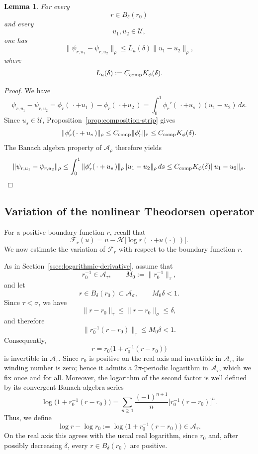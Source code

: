 \documentclass[11pt,a4paper]{amsart}
\newtheorem{lemma}[theorem]{Lemma}
\begin{document}
\begin{lemma}\label{lem:psi-u-stability}
	For every
	\[
	r\in B_\delta(r_0)
	\]
	and every
	\[
	u_1,u_2\in\mathcal U,
	\]
	one has
	\begin{equation}\label{eq:psi-u-stability}
		\|\psi_{r,u_1}-\psi_{r,u_2}\|_\rho
		\le
		L_u(\delta)
		\|u_1-u_2\|_\rho,
	\end{equation}
	where
	\begin{equation}\label{eq:Lu}
		L_u(\delta)
		:=
		C_{\rm comp}K_\phi(\delta).
	\end{equation}
\end{lemma}

\begin{proof}
	We have
	\[
		\psi_{r,u_1}-\psi_{r,u_2}=
		\phi_r(\,\cdot+u_1\,)-\phi_r(\,\cdot+u_2\,)=
		\int_0^1\phi_r'(\,\cdot+u_s\,)(u_1-u_2)\,ds.
	\]
	Since $u_s\in\mathcal U$, Proposition~\ref{prop:composition-strip}
	gives
	\[
	\|\phi_r'(\,\cdot+u_s\,)\|_\rho
	\le
	C_{\rm comp}\|\phi_r'\|_\tau
	\le
	C_{\rm comp}K_\phi(\delta).
	\]
	The Banach algebra property of $\mathcal A_\rho$ therefore yields
	\[
		\|\psi_{r,u_1}-\psi_{r,u_2}\|_\rho\le
		\int_0^1\|\phi_r'(\,\cdot+u_s\,)\|_\rho\|u_1-u_2\|_\rho\,ds\le
		C_{\rm comp}K_\phi(\delta)\|u_1-u_2\|_\rho.
	\]
\end{proof}

\subsection{Variation of the nonlinear Theodorsen operator}
\label{sec:variation-F}

For a positive boundary function $r$, recall that
\[
\mathcal F_r(u)
=
u-\mathcal H\bigl[\log r(\,\cdot+u(\cdot)\,)\bigr].
\]
We now estimate the variation of $\mathcal F_r$ with respect to the
boundary function $r$.

As in Section~\ref{ssec:logarithmic-derivative}, assume that
\[
r_0^{-1}\in\mathcal A_\tau,
\qquad
M_0:=\|r_0^{-1}\|_\tau,
\]
and let
\[
r\in B_\delta(r_0)\subset\mathcal A_\sigma,
\qquad
M_0\delta<1.
\]
Since $\tau<\sigma$, we have
\[
\|r-r_0\|_\tau
\le
\|r-r_0\|_\sigma
\le
\delta,
\]
and therefore
\[
\|r_0^{-1}(r-r_0)\|_\tau
\le
M_0\delta
<
1.
\]
Consequently,
\[
r
=
r_0\bigl(1+r_0^{-1}(r-r_0)\bigr)
\]
is invertible in $\mathcal A_\tau$. Since $r_0$ is positive on the real axis and invertible in
$\mathcal A_\tau$, its winding number is zero; hence it admits a
$2\pi$-periodic logarithm in $\mathcal A_\tau$, which we fix once and
for all. Moreover, the logarithm of the
second factor is well defined by its convergent Banach-algebra series
\[
\log\bigl(1+r_0^{-1}(r-r_0)\bigr)
=
\sum_{n\ge1}
\frac{(-1)^{n+1}}{n}
\bigl[r_0^{-1}(r-r_0)\bigr]^n.
\]
Thus, we define
\[
\log r-\log r_0
:=
\log\bigl(1+r_0^{-1}(r-r_0)\bigr)
\in\mathcal A_\tau.
\]
On the real axis this agrees with the usual real logarithm, since
$r_0$ and, after possibly decreasing $\delta$, every
$r\in B_\delta(r_0)$ are positive.
\end{document}

